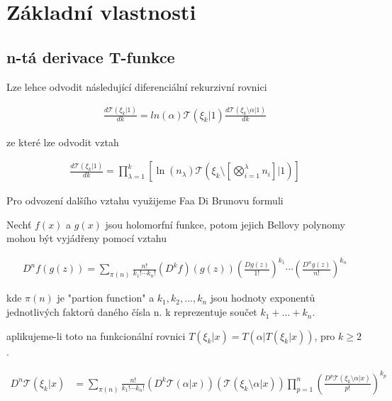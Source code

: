 
\section{Základní vlastnosti}

\subsection{n-tá derivace T-funkce}

Lze lehce odvodit následující diferenciální rekurzivní rovnici

\begin{align}
      \frac{d\mathcal{T}(\xi_k|1)}{dk} = ln(\alpha) 
      \mathcal{T}(\xi_k | 1)  \frac{d\mathcal{T}(\xi_k
      \setminus \alpha|1)}{dk}
\end{align}

ze které lze odvodit vztah

\begin{align}
      \frac{d\mathcal{T}(\xi_k|1)}{dk} = \prod_{\lambda = 
      1}^k \left[ \ln(n_{\lambda}) \mathcal{T}(\xi_k \setminus
      \left[ \bigotimes_{i=1}^\lambda n_i\right] | 1 )\right]
\end{align}

Pro odvození dalšího vztahu využijeme Faa Di Brunovu formuli

\begin{definition}
      Nechť \(f(x)\) a \(g(x)\) jsou holomorfní funkce, 
      potom jejich Bellovy polynomy mohou být vyjádřeny 
      pomocí vztahu
      
      \begin{eqnarray}
            D^nf(g(z))=
            \sum_{\pi(n)} \frac{n!}{k_1! \cdots k_n!} 
            (D^kf)(g(z))
            \left(\frac{Dg(z)}{1!}\right)^{k_1} 
            \cdots \left(\frac{D^ng(z)}{n!}\right)^{k_n}
      \end{eqnarray}
      
      kde \(\pi(n)\) je "partion function" a \(k_1, k_2, ..., k_n\) 
      jsou hodnoty exponentů jednotlivých faktorů daného čísla n. k 
      reprezentuje součet \(k_1 + ... + k_n \).
      
\end{definition}

aplikujeme-li toto na funkcionální rovnici 
\(T(\xi_k | x) = T(\alpha | T(\xi_k  | x))\), pro \(k \geq 2\).

\begin{align}
      D^n \mathcal{T}(\xi_k | x) &= \sum_{\pi(n)}
      \frac{n!}{k_1! \cdots k_n!} 
      (D^k \mathcal{T}(\alpha | x))(\mathcal{T}(\xi_k 
      \setminus \alpha | x)) \prod_{p = 1}^n
      \left(\frac{D^p\mathcal{T}(\xi_k \setminus \alpha 
      | x)}{p!}\right)^{k_p} 
\end{align}

